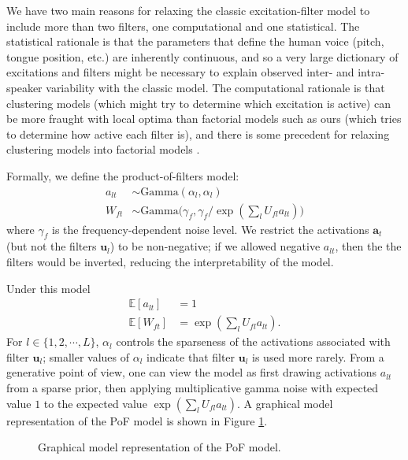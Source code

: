 \documentclass{article} %
\begin{document}
We have two main reasons for relaxing the classic excitation-filter
model to include more than two filters, one computational and one
statistical. The statistical rationale is that the parameters that
define the human voice (pitch, tongue position, etc.) are inherently
continuous, and so a very large dictionary of excitations and filters
might be necessary to explain observed inter- and intra-speaker
variability with the classic model. The computational rationale is
that clustering models (which might try to determine which excitation
is active) can be more fraught with local optima than factorial models
such as ours (which tries to determine how active each filter is), and
there is some precedent for relaxing clustering models into factorial
models \cite{ding2004k}.

Formally, we define the product-of-filters model:
\begin{equation} \label{eq:model}
\begin{split}
a_{lt} &\sim \text{Gamma}(\alpha_l, \alpha_l)\\
W_{ft} &\sim \text{Gamma}\Big(\gamma_f, \gamma_f / \exp(\textstyle{\sum_l} U_{fl} a_{lt})\Big) 
\end{split}
\end{equation}
where $\gamma_f$ is the frequency-dependent noise level. We restrict
the activations $\bm{a}_t$ (but not the filters
$\bm{u}_l$) to be non-negative; if we allowed negative $a_{lt}$, then
the the filters would be inverted, reducing the interpretability of
the model.

Under this model
\begin{equation}
\begin{split}
\mathbb{E}[a_{lt}] &= 1\\
\mathbb{E}[W_{ft}] &= \exp(\textstyle{\sum_l} U_{fl} a_{lt}).
\end{split}
\end{equation}
For $l \in \{1, 2, \cdots, L\}$, $\alpha_l$ controls the sparseness of
the activations associated with filter $\bm{u}_l$; smaller values of 
$\alpha_l$ indicate that filter $\bm{u}_l$ is used more
rarely. From a generative point of view, one can view the
model as first drawing activations $a_{lt}$ from a sparse prior, then
applying multiplicative gamma noise with expected value $1$ to the
expected value $\exp(\sum_l U_{fl} a_{lt})$. A graphical model
representation of the PoF model is shown in Figure
\ref{fig:sf_prior}. 
\begin{figure}[ht]
  \centering
     
  \caption{Graphical model representation of the PoF model.}
\label{fig:sf_prior}
\end{figure}
\end{document}
